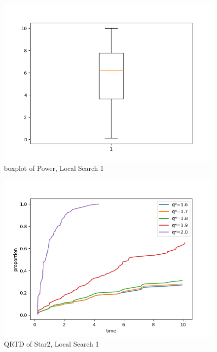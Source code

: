 \documentclass[acmlarge]{acmart}
\begin{document}
\begin{figure}[p]
	\includegraphics[width=\linewidth]{power_boxplot_LS1.png}
	\caption{boxplot of Power, Local Search 1}
\end{figure}


\begin{figure}[p]
	\includegraphics[width=\linewidth]{star2_QRTD_LS1.png}
	\caption{QRTD of Star2, Local Search 1}
\end{figure}
\end{document}
